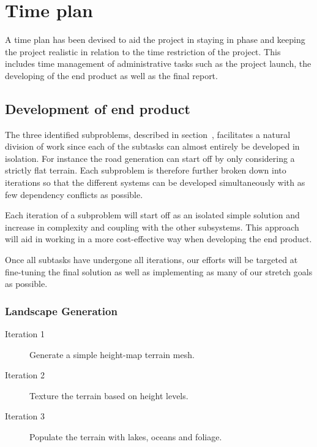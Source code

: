 \section{Time plan}
%

A time plan has been devised to aid the project in staying in phase and keeping the project realistic in relation to the time restriction of the project.
This includes time management of administrative tasks such as the project launch, the developing of the end product as well as the final report.

\subsection{Development of end product}
The three identified subproblems, described in section~, facilitates a natural division of work since each of the subtasks can almost entirely be developed in isolation.
For instance the road generation can start off by only considering a strictly flat terrain.
Each subproblem is therefore further broken down into iterations so that the different systems can be developed simultaneously with as few dependency conflicts as possible.

Each iteration of a subproblem will start off as an isolated simple solution and increase in complexity and coupling with the other subsystems.
This approach will aid in working in a more cost-effective way when developing the end product.

Once all subtasks have undergone all iterations, our efforts will be targeted at fine-tuning the final solution as well as implementing as many of our stretch goals as possible.

\subsubsection{Landscape Generation}
\begin{description}
  \item[Iteration 1] Generate a simple height-map terrain mesh.
  \item[Iteration 2] Texture the terrain based on height levels.
  \item[Iteration 3] Populate the terrain with lakes, oceans and foliage.
\end{description}

